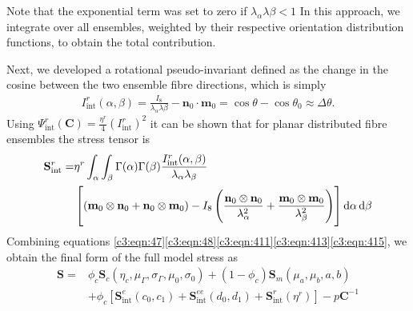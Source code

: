     Note that the exponential term was set to zero if $\lambda_\alpha\lambda\beta<1$ In this approach, we integrate over all ensembles, weighted by their respective orientation distribution functions, to obtain the total contribution.
    
    
    Next, we developed a rotational pseudo-invariant defined as the change in the cosine between the two ensemble fibre directions, which is simply
        \begin{equation}\label{c3:eqn:414}
        \begin{aligned}
        I_\mathrm{int}^r(\alpha,\beta) = \frac{I_8}{\lambda_\alpha\lambda\beta} - \mathbf{n}_0\cdot\mathbf{m}_0 = \cos{\theta}-\cos{\theta_0}\approx \Delta\theta.
        \end{aligned}
        \end{equation}
    Using $\Psi_\mathrm{int}^r(\mathbf{C}) = \frac{\eta^r}{4}(I_\mathrm{int}^r)^2$ it can be shown that for planar distributed fibre ensembles the stress tensor is
        \begin{equation}\label{c3:eqn:415}
        \begin{aligned}
        \mathbf{S}_\mathrm{int}^r =& \eta^r \int_\alpha\int_\beta \Gamma(\alpha)\Gamma(\beta) \frac{I_\mathrm{int}^r(\alpha,\beta)}{\lambda_\alpha\lambda_\beta}  \\
        &\left[\left(\mathbf{m}_0\otimes\mathbf{n}_0 + \mathbf{n}_0\otimes\mathbf{m}_0\right)
        - I_8
        \left(\frac{\mathbf{n}_0\otimes\mathbf{n}_0}{\lambda_\alpha^2} + \frac{\mathbf{m}_0\otimes\mathbf{m}_0}{\lambda_\beta^2}\right)\right]\dif\alpha\dif\beta
        \end{aligned}
        \end{equation}
    Combining equations \ref{c3:eqn:47}\ref{c3:eqn:48}\ref{c3:eqn:411}\ref{c3:eqn:413}\ref{c3:eqn:415}, we obtain the final form of the full model stress as
        \begin{equation}\label{c3:eqn:416}
        \begin{aligned}
        \mathbf{S} =& \phi_c\mathbf{S}_c(\eta_c, \mu_\Gamma, \sigma_\Gamma, \mu_0, \sigma_0) + (1-\phi_c)\mathbf{S}_m(\mu_a, \mu_b, a, b) \\
        &+ \phi_c[\mathbf{S}_\mathrm{int}^e(c_0,c_1) + \mathbf{S}_\mathrm{int}^{ee}(d_0,d_1) + \mathbf{S}_\mathrm{int}^r(\eta^r)] - p\mathbf{C}^{-1}
        \end{aligned}
        \end{equation}
    
        
        
        